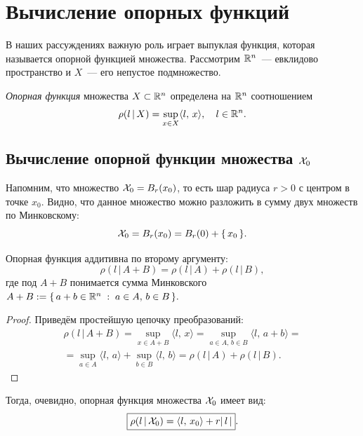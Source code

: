 \section{Вычисление опорных функций}

В наших рассуждениях важную роль играет выпуклая функция, которая называется опорной функцией множества.
Рассмотрим $\mathbb{R}^n$~--- евклидово пространство и $X$~--- его непустое подмножество.

\begin{definition}
        \textit{Опорная функция} множества $X \subset \mathbb{R}^n$ определена на $\mathbb{R}^n$ соотношением
        $$
                \rho(l\,|\,X) = \sup\limits_{x \in X} \langle l,\,x\rangle,\quad l \in \mathbb{R}^n.
        $$
\end{definition}

\subsection{Вычисление опорной функции множества $\mathcal{X}_0$}

Напомним, что множество $\mathcal{X}_0 = B_r(x_0)$, то есть шар радиуса $r > 0$ с центром в точке $x_0$.
Видно, что данное множество можно разложить в сумму двух множеств по Минковскому:
$$
        \mathcal{X}_0 = B_r(x_0) = B_r(0) + \{\,x_0\,\}.
$$

\begin{assertion}
        Опорная функция аддитивна по второму аргументу:
        $$
                \rho(l\,|\,A + B) = \rho(l\,|\,A) + \rho(l\,|\, B), 
        $$
        где под $A + B$ понимается сумма Минковского
        $
                A + B :=\{\,a+b \in \mathbb{R}^n \;:\; a \in A,\,b \in B\,\}.
        $
\end{assertion}
\begin{proof}
        Приведём простейшую цепочку преобразований:
        \begin{multline*}
                \rho(l\,|\,A + B) = \sup\limits_{x \in A + B}\langle l,\,x\rangle = \sup\limits_{a \in A,\,b \in B}\langle l,\,a + b\rangle =\\= \sup\limits_{a \in A}\langle l,\,a \rangle + \sup\limits_{b \in B}\langle l,\,b\rangle = \rho(l\,|\,A) + \rho(l\,|\,B).
        \end{multline*}
\end{proof}

Тогда, очевидно, опорная функция множества $\mathcal{X}_0$ имеет вид:
\begin{equation}\label{eq:support_x0}
        \boxed{
                \rho(l\,|\,\mathcal{X}_0) = \langle l,\,x_0\rangle + r|\,l\,|
        }.
\end{equation}


